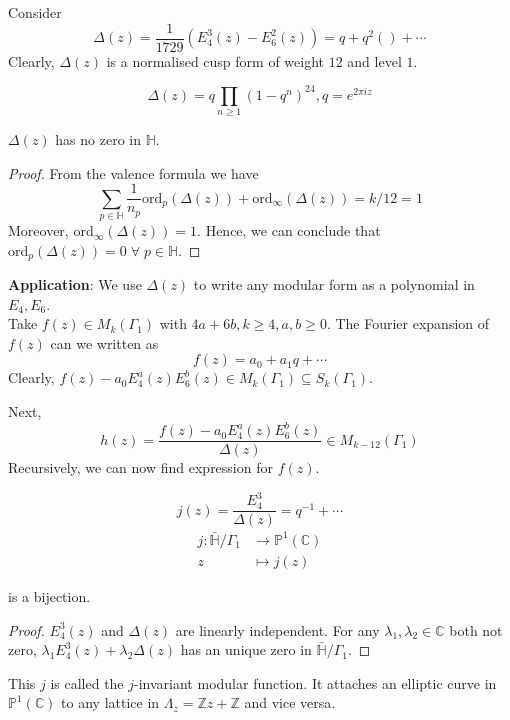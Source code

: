 \documentclass[oneside, 12pt]{scrbook}
\newcommand{\CC}{\mathbb C}
\newcommand{\ZZ}{\mathbb Z}
\newcommand{\PP}{\mathbb{P}}
\newcommand{\ord}{\mathrm{ord}}
\theoremstyle{theorem}
\begin{document}
Consider $$\Delta (z) = \frac{1}{1729} (E_{4}^3(z) - E_{6}^2(z)) = q + q^2() + \cdots $$
Clearly, $\Delta(z)$ is a normalised cusp form of weight $12$ and level $1$. 

\begin{theorem}
$$\Delta (z) = q \prod_{n \geq 1} (1-q^{n})^{24}, q=e^{2\pi i z}$$
\end{theorem}

\begin{proposition}
$\Delta(z)$ has no zero in $\mathbb{H}$.
\end{proposition}

\begin{proof}
From the valence formula we have $$\sum_{p \in \mathbb{H}} \frac{1}{n_{p}} \ord_{p}(\Delta(z)) + \ord_{\infty} (\Delta(z)) = k/12 =1$$ Moreover, $\ord_{\infty} (\Delta(z))=1$. Hence, we can conclude that $\ord_{p}(\Delta(z)) =0 \; \forall \; p \in \mathbb{H}$.
\end{proof}

\textbf{Application}: We use $\Delta(z)$ to write any modular form as a polynomial in $E_{4},E_{6}$. \\

Take $f(z) \in M_{k} (\Gamma_{1})$ with $4a+6b , k \geq 4, a,b\geq 0$. The Fourier expansion of $f(z)$ can we written as $$f(z) = a_{0} + a_{1}q + \cdots $$
Clearly, $f(z) - a_{0}E_{4}^a(z)E_{6}^b(z) \in M_{k}(\Gamma_{1}) \subseteq S_{k}(\Gamma_{1})$.

Next, $$h(z) = \frac{f(z)-a_{0}E_{4}^a(z)E_{6}^b(z)}{\Delta(z)} \in M_{k-12}(\Gamma_{1})$$ Recursively, we can now find expression for $f(z)$. 

\begin{proposition}
$$j(z) = \frac{E_{4}^3}{\Delta(z)} = q^{-1} + \cdots $$
\begin{align*}
j: \bar{\mathbb{H}}/\Gamma_{1} &\rightarrow \PP^1(\CC) \\
z &\mapsto j(z)
\end{align*}

is a bijection.
\end{proposition}

\begin{proof}
$E_{4}^3(z)$ and $\Delta(z)$ are linearly independent. For any $\lambda_{1},\lambda_{2} \in \CC$ both not zero, $\lambda_{1}E_{4}^3(z) + \lambda_{2}\Delta(z)$ has an unique zero in $\bar{\mathbb{H}}/\Gamma_{1}$. 
\end{proof}

\begin{remark}
This $j$ is called the $j$-invariant modular function. It attaches an elliptic curve in $\PP^1 (\CC)$ to any lattice in $\Lambda_{z} = \ZZ z + \ZZ$ and vice versa.
\end{remark}
\end{document}
